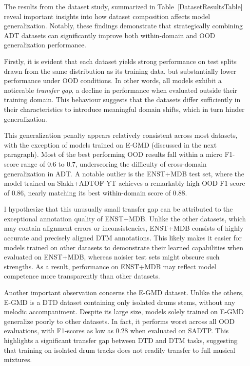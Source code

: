 The results from the dataset study, summarized in Table~\ref{DatasetResultsTable} reveal important insights into how dataset composition affects model generalization. Notably, these findings demonstrate that strategically combining \gls{ADT} datasets can significantly improve both within-domain and \acrfull{OOD} generalization performance.

Firstly, it is evident that each dataset yields strong performance on test splits drawn from the same distribution as its training data, but substantially lower performance under \gls{OOD} conditions. In other words, all models exhibit a noticeable \textit{transfer gap}, a decline in performance when evaluated outside their training domain. This behaviour suggests that the datasets differ sufficiently in their characteristics to introduce meaningful domain shifts, which in turn hinder generalization.

This generalization penalty appears relatively consistent across most datasets, with the exception of models trained on E-GMD (discussed in the next paragraph). Most of the best performing \gls{OOD} results fall within a micro F1-score range of $0.6$ to $0.7$, underscoring the difficulty of cross-domain generalization in \gls{ADT}. A notable outlier is the ENST+MDB test set, where the model trained on Slakh+ADTOF-YT achieves a remarkably high \gls{OOD} F1-score of $0.86$, nearly matching its best within-domain score of $0.88$. 

I hypothesize that this unusually small transfer gap can be attributed to the exceptional annotation quality of ENST+MDB. Unlike the other datasets, which may contain alignment errors or inconsistencies, ENST+MDB consists of highly accurate and precisely aligned \gls{DTM} annotations. This likely makes it easier for models trained on other datasets to demonstrate their learned capabilities when evaluated on ENST+MDB, whereas noisier test sets might obscure such strengths. As a result, performance on ENST+MDB may reflect model competence more transparently than other datasets.

Another important observation concerns the E-GMD dataset. Unlike the others, E-GMD is a \acrfull{DTD} dataset containing only isolated drums stems, without any melodic accompaniment. Despite its large size, models solely trained on E-GMD generalize poorly to other datasets. In fact, it performs worst across all \gls{OOD} evaluations, with F1-scores as low as $0.28$ when evaluated on SADTP. This highlights a significant transfer gap between \gls{DTD} and \gls{DTM} tasks, suggesting that training on isolated drum tracks does not readily transfer to full musical mixtures. 

